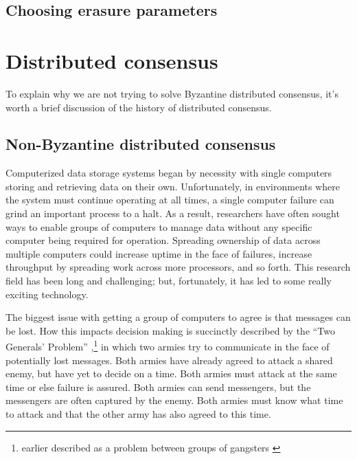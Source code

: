 \documentclass[8pt,fleqn,openany]{book}
\begin{document}


\pagebreak
\section{Choosing erasure parameters}
\label{sec:RS}





\newpage \appendix
{}

\chapter{Distributed consensus}\label{chap:dist-consensus}

To explain why we are not trying to solve Byzantine distributed consensus,
it's worth a brief discussion of the history of distributed consensus.

\section{Non-Byzantine distributed consensus}

Computerized data storage systems began by necessity with single computers
storing and retrieving data on their own. Unfortunately, in environments where
the system must continue operating at all times, a single computer failure can
grind an important process to a halt. As a result, researchers have often
sought ways to enable groups of computers to manage data
without any specific computer being required for operation. Spreading ownership
of data across multiple computers could increase uptime in the face of failures,
increase throughput by spreading work across more processors, and so forth.
This research field has been long and challenging; but, fortunately, it has led
to some really exciting technology.

The biggest issue with getting a group of computers to agree is that messages
can be lost. How this impacts decision making is succinctly described by the
``Two Generals' Problem'' \cite{two-generals},\footnote{
earlier described as a problem
between groups of gangsters \cite{two-gangsters}} in which two armies try to
communicate in the face of potentially lost messages. Both armies have already
agreed to attack a shared enemy, but have yet to decide on a time. Both armies
must attack at the same time or else failure is assured. Both armies can send
messengers, but the messengers are often captured by the enemy. Both armies must
know what time to attack and that the other army has also agreed to this time.
\end{document}
